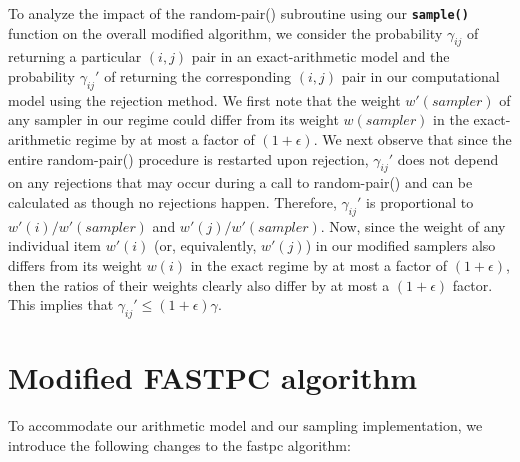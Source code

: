 \documentclass[11pt]{article}
\newcommand{\func}[1]{{\bf\texttt{#1}}}
\newcommand{\epsUp}{(1+\epsilon)}
\begin{document}
To analyze the impact of the random-pair() subroutine using our \func{sample()} function on the overall modified algorithm, we consider the probability $\gamma_{ij} $ of returning a particular $(i,j)$ pair in an exact-arithmetic model and the probability $\gamma_{ij}'$ of returning the corresponding $(i,j)$ pair in our computational model using the rejection method.
We first note that the weight $w'(sampler)$ of any sampler in our regime could differ from its weight $w(sampler)$ in the exact-arithmetic regime by at most a factor of $\epsUp$.  
We next observe that since the entire random-pair() procedure is restarted upon rejection, $\gamma_{ij} '$ does not depend on any rejections that may occur during a call to random-pair() and can be calculated as though no rejections happen.  
Therefore, $\gamma_{ij}'$ is proportional to $w'(i)/w'(sampler)$ and $w'(j)/w'(sampler)$.
Now, since the weight of any individual item $w'(i)$ (or, equivalently, $w'(j)$) in our modified samplers also differs from its weight $w(i)$ in the exact regime by at most a factor of $\epsUp$, then the ratios of their weights clearly also differ by at most a $\epsUp$ factor.  
This implies that $\gamma_{ij} ' \le \epsUp \gamma$. 

   
   \section{Modified FASTPC algorithm} \label{sec:mod-fastpc}
To accommodate our arithmetic model and our sampling implementation, we introduce the following changes to the fastpc algorithm:

\end{document}

